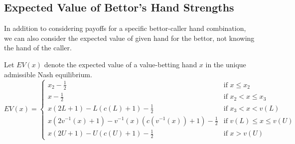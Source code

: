 \documentclass[../../main/main.tex]{subfiles}
\begin{document}
\subsection{Expected Value of Bettor's Hand Strengths}
\label{bettor_ev}

In addition to considering payoffs for a specific bettor-caller hand combination, we can also consider the expected value of given hand for the bettor, not knowing the hand of the caller. 

\begin{theorem}
    \label{thm:ev_bettor}
    Let $EV(x)$ denote the expected value of a value-betting hand $x$ in the unique admissible Nash equilibrium.
    \begin{equation}
        EV(x) = \begin{cases}
            x_2-\frac{1}{2} & \text{if } x \leq x_2 \\
            x-\frac{1}{2} & \text{if } x_2 < x \le x_3 \\
            x(2L + 1) - L(c(L) + 1) - \frac{1}{2} & \text{if } x_3 < x < v(L) \\
            x(2v^{-1}(x) + 1) - v^{-1}(x)(c(v^{-1}(x)) + 1) - \frac{1}{2} & \text{if } v(L) \leq x \leq v(U) \\
            x(2U + 1) - U(c(U) + 1) - \frac{1}{2} & \text{if } x > v(U)
        \end{cases}
    \end{equation}
\end{theorem}
\end{document}
